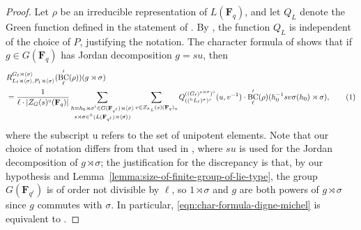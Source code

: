 \documentclass[11pt,reqno]{amsart}
\theoremstyle{definition}
\newcommand{\F}{{\mathbf F}}
\DeclareMathOperator{\BC}{BC}
\begin{document}
\begin{proof}
    Let $\rho$ be an irreducible representation of $L(\F_q)$, and let $Q_L$ denote the Green function defined in the statement of \cite[Proposition 2.6]{DM94}. By \cite[Theorem 8.7.2]{GRV26}, the function $Q_L$ is independent of the choice of $P$, justifying the notation. The character formula of \cite[Proposition 2.6]{DM94} shows that if $g \in G(\F_q)$ has Jordan decomposition $g = su$, then
    \begin{align*}
    &R_{L_\ell \rtimes\langle\sigma\rangle, P_1 \rtimes \langle\sigma\rangle}^{G_\ell\rtimes\langle\sigma\rangle}(\BC_\ell'(\rho))(g \rtimes\sigma)\\
    &= \frac{1}{\ell \cdot|Z_G(s)^\circ(\F_q)|} \sum_{\substack{h = h_0 \rtimes \sigma^i \in G(\F_{q^\ell}) \rtimes \langle\sigma\rangle \\ s \rtimes \sigma \in {}^h(L(\F_{q^\ell})\rtimes\langle\sigma\rangle)}} \sum_{v \in Z_{^hL}(s)(\F_q)_{\mathrm{u}}} Q_{(({}^hL_\ell)^\sigma)^\circ}^{((G_\ell)^{s \rtimes \sigma})^\circ}(u, v^{-1}) \cdot \BC'_\ell(\rho)(h_0^{-1}sv\sigma(h_0) \rtimes \sigma), \addtocounter{equation}{1}\tag{\theequation} \label{eqn:char-formula-digne-michel}
    \end{align*}
    where the subscript $\mathrm{u}$ refers to the set of unipotent elements. Note that our choice of notation differs from that used in \cite[Proposition 2.6]{DM94}, where $su$ is used for the Jordan decomposition of $g \rtimes \sigma$; the justification for the discrepancy is that, by our hypothesis and Lemma~\ref{lemma:size-of-finite-group-of-lie-type}, the group $G(\F_{q^\ell})$ is of order not divisible by $\ell$, so $1 \rtimes \sigma$ and $g$ are both powers of $g \rtimes \sigma$ since $g$ commutes with $\sigma$. In particular, \eqref{eqn:char-formula-digne-michel} is equivalent to \cite[Proposition 2.6]{DM94}.


\end{proof}
\end{document}
